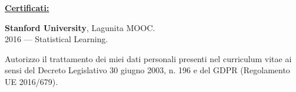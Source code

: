 \documentclass[a4paper,10pt,fullpage]{article}
\begin{document}
\begin{center}
\underline{\textbf{\large Certificati:}}
\end{center}	

\textbf{Stanford University}, Lagunita MOOC.\\
2016 --- Statistical Learning.

	




\vfill

\hline
\vspace{3pt}
\scriptsize Autorizzo il trattamento dei miei dati personali presenti nel curriculum vitae ai sensi del Decreto Legislativo 30 giugno 2003, n. 196 e del GDPR (Regolamento UE 2016/679).

\end{document}
